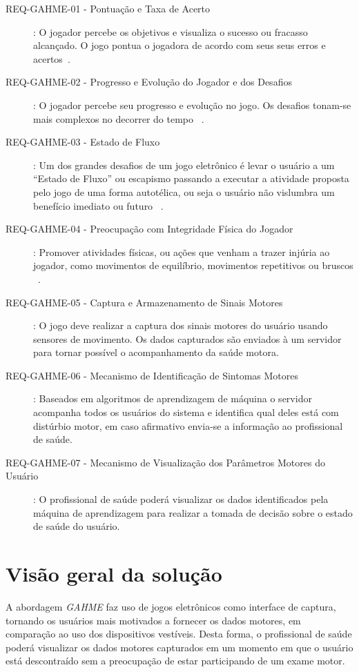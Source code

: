 \begin{description}
	\item[REQ-GAHME-01 - Pontuação e Taxa de Acerto]: O jogador percebe os objetivos e visualiza o sucesso ou fracasso alcançado. O jogo pontua o jogadora de acordo com seus seus erros e acertos~\cite{Suhonen:2008:SFE:1457199.1457204,sinclair07}.
	\item[REQ-GAHME-02 - Progresso e Evolução do Jogador e dos Desafios]: O jogador percebe seu progresso e evolução no jogo. Os desafios tonam-se mais complexos no decorrer do tempo ~\cite{Suhonen:2008:SFE:1457199.1457204}.
	\item[REQ-GAHME-03 - Estado de Fluxo]: Um dos grandes desafios de um jogo eletrônico é levar o usuário a um ``Estado de Fluxo'' ou escapismo passando a executar a atividade proposta pelo jogo de uma forma autotélica, ou seja o usuário não vislumbra um benefício imediato ou futuro ~\cite{sweetser2005-gameflow}. 
	\item[REQ-GAHME-04 - Preocupação com Integridade Física do Jogador]: Promover atividades físicas, ou ações que venham a trazer injúria ao jogador, como movimentos de equilíbrio, movimentos repetitivos ou bruscos ~\cite{sinclair07,arntzen2011}.
		\item[REQ-GAHME-05 - Captura e Armazenamento de Sinais Motores]: O jogo deve realizar a captura dos sinais motores do usuário usando sensores de movimento. Os dados capturados são enviados à um servidor para tornar possível o acompanhamento da saúde motora.
	\item[REQ-GAHME-06 - Mecanismo de Identificação de Sintomas Motores]: Baseados em algoritmos de aprendizagem de máquina o servidor acompanha todos os usuários do sistema e identifica qual deles está com distúrbio motor, em caso afirmativo envia-se a informação ao profissional de saúde.
	\item[REQ-GAHME-07 - Mecanismo de Visualização dos Parâmetros Motores do Usuário]: O profissional de saúde poderá visualizar os dados identificados pela máquina de aprendizagem para realizar a tomada de decisão sobre o estado de saúde do usuário.
\end{description}

\section{Visão geral da solução}

A abordagem \textit{GAHME} faz uso de jogos eletrônicos como interface de captura, tornando os usuários mais motivados a fornecer os dados motores, em comparação ao uso dos dispositivos vestíveis. Desta forma, o profissional de saúde poderá visualizar os dados motores capturados em um momento em que o usuário está descontraído sem a preocupação de estar participando de um exame motor. 

